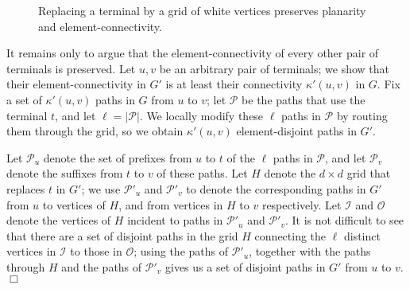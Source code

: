 \documentclass[11pt]{article}
\newcommand{\elconn}{\kappa'}
\newenvironment{proofsketch}{\vspace{-0.1in}\noindent{\bf Proof Sketch:}}{\hspace*{\fill}$\Box$\par}
\def\script#1{\mathcal{#1}}
\begin{document}
\begin{proofsketch}
\begin{figure}
\begin{center}
    \end{center}
    \caption{Replacing a terminal by a grid of white vertices
      preserves planarity and element-connectivity.} \label{fig:grid}
  \end{figure}

  It remains only to argue that the element-connectivity of every
  other pair of terminals is preserved. Let $u,v$ be an arbitrary pair
  of terminals; we show that their element-connectivity in $G'$ is at
  least their connectivity $\elconn(u,v)$ in $G$. Fix a set of
  $\elconn(u,v)$ paths in $G$ from $u$ to $v$; let $\script{P}$ be the
  paths that use the terminal $t$, and let $\ell = |\script{P}|$. We
  locally modify these $\ell$ paths in $\script{P}$ by routing them through
  the grid, so we obtain $\elconn(u,v)$ element-disjoint paths in
  $G'$.

  Let $\script{P}_u$ denote the set of prefixes from $u$ to $t$ of the
  $\ell$ paths in $\script{P}$, and let $\script{P}_v$ denote the
  suffixes from $t$ to $v$ of these paths. Let $H$ denote the $d
  \times d$ grid that replaces $t$ in $G'$; we use $\script{P}'_u$ and
  $\script{P}'_v$ to denote the corresponding paths in $G'$ from $u$
  to vertices of $H$, and from vertices in $H$ to $v$ respectively.
  Let $\script{I}$ and $\script{O}$ denote the vertices of $H$
  incident to paths in $\script{P}'_u$ and $\script{P}'_v$.  It is not
  difficult to see that there are a set of disjoint paths in the grid
  $H$ connecting the $\ell$ distinct vertices in $\script{I}$ to those
  in $\script{O}$; using the paths of $\script{P}'_u$, together with
  the paths through $H$ and the paths of $\script{P}'_v$ gives us a
  set of disjoint paths in $G'$ from $u$ to $v$.
\end{proofsketch}

\iffalse
To extend this algorithm to graphs of genus $g$, we simply need a
Lemma analogous to Lemma~\ref{lem:parallelEdges}; that is, we need to
show that if $G$ is the multigraph of the reduced instance (in which
we removed white vertices of degree 2), and $G'$ the graph of genus
$g$ in which we keep only a single copy of each edge of $G$, some
terminal $t$ has low degree in $G'$.
\fi
\end{document}
